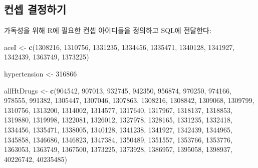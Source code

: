 \documentclass[11pt]{book}
\newenvironment{Shaded}{\begin{snugshade}}{\end{snugshade}}
\newcommand{\KeywordTok}[1]{\textcolor[rgb]{0.13,0.29,0.53}{\textbf{#1}}}
\newcommand{\DecValTok}[1]{\textcolor[rgb]{0.00,0.00,0.81}{#1}}
\newcommand{\StringTok}[1]{\textcolor[rgb]{0.31,0.60,0.02}{#1}}
\newcommand{\NormalTok}[1]{#1}
\theoremstyle{definition}
\theoremstyle{definition}
\theoremstyle{definition}
\theoremstyle{remark}
\begin{document}
\subsection{컨셉 결정하기}\label{-}

가독성을 위해 R에 필요한 컨셉 아이디들을 정의하고 SQL에 전달한다:

\begin{Shaded}
\begin{Highlighting}[]
\NormalTok{aceI <-}\StringTok{ }\KeywordTok{c}\NormalTok{(}\DecValTok{1308216}\NormalTok{, }\DecValTok{1310756}\NormalTok{, }\DecValTok{1331235}\NormalTok{, }\DecValTok{1334456}\NormalTok{, }\DecValTok{1335471}\NormalTok{, }\DecValTok{1340128}\NormalTok{, }\DecValTok{1341927}\NormalTok{,}
          \DecValTok{1342439}\NormalTok{, }\DecValTok{1363749}\NormalTok{, }\DecValTok{1373225}\NormalTok{)}

\NormalTok{hypertension <-}\StringTok{ }\DecValTok{316866}

\NormalTok{allHtDrugs <-}\StringTok{ }\KeywordTok{c}\NormalTok{(}\DecValTok{904542}\NormalTok{, }\DecValTok{907013}\NormalTok{, }\DecValTok{932745}\NormalTok{, }\DecValTok{942350}\NormalTok{, }\DecValTok{956874}\NormalTok{, }\DecValTok{970250}\NormalTok{, }\DecValTok{974166}\NormalTok{,}
                  \DecValTok{978555}\NormalTok{, }\DecValTok{991382}\NormalTok{, }\DecValTok{1305447}\NormalTok{, }\DecValTok{1307046}\NormalTok{, }\DecValTok{1307863}\NormalTok{, }\DecValTok{1308216}\NormalTok{,}
                  \DecValTok{1308842}\NormalTok{, }\DecValTok{1309068}\NormalTok{, }\DecValTok{1309799}\NormalTok{, }\DecValTok{1310756}\NormalTok{, }\DecValTok{1313200}\NormalTok{, }\DecValTok{1314002}\NormalTok{,}
                  \DecValTok{1314577}\NormalTok{, }\DecValTok{1317640}\NormalTok{, }\DecValTok{1317967}\NormalTok{, }\DecValTok{1318137}\NormalTok{, }\DecValTok{1318853}\NormalTok{, }\DecValTok{1319880}\NormalTok{,}
                  \DecValTok{1319998}\NormalTok{, }\DecValTok{1322081}\NormalTok{, }\DecValTok{1326012}\NormalTok{, }\DecValTok{1327978}\NormalTok{, }\DecValTok{1328165}\NormalTok{, }\DecValTok{1331235}\NormalTok{,}
                  \DecValTok{1332418}\NormalTok{, }\DecValTok{1334456}\NormalTok{, }\DecValTok{1335471}\NormalTok{, }\DecValTok{1338005}\NormalTok{, }\DecValTok{1340128}\NormalTok{, }\DecValTok{1341238}\NormalTok{,}
                  \DecValTok{1341927}\NormalTok{, }\DecValTok{1342439}\NormalTok{, }\DecValTok{1344965}\NormalTok{, }\DecValTok{1345858}\NormalTok{, }\DecValTok{1346686}\NormalTok{, }\DecValTok{1346823}\NormalTok{,}
                  \DecValTok{1347384}\NormalTok{, }\DecValTok{1350489}\NormalTok{, }\DecValTok{1351557}\NormalTok{, }\DecValTok{1353766}\NormalTok{, }\DecValTok{1353776}\NormalTok{, }\DecValTok{1363053}\NormalTok{,}
                  \DecValTok{1363749}\NormalTok{, }\DecValTok{1367500}\NormalTok{, }\DecValTok{1373225}\NormalTok{, }\DecValTok{1373928}\NormalTok{, }\DecValTok{1386957}\NormalTok{, }\DecValTok{1395058}\NormalTok{,}
                  \DecValTok{1398937}\NormalTok{, }\DecValTok{40226742}\NormalTok{, }\DecValTok{40235485}\NormalTok{)}
\end{Highlighting}
\end{Shaded}
\end{document}
